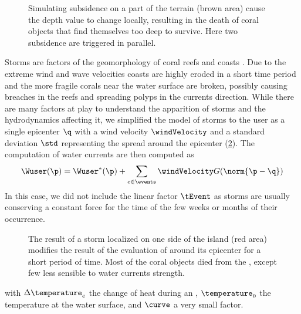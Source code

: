 \begin{figure}
    \caption{Simulating subsidence on a part of the terrain (brown area) cause the depth value to change locally, resulting in the death of coral objects that find themselves too deep to survive. Here two subsidence  are triggered in parallel. }
    \label{fig:env-obj_subsidence-event}
\end{figure}

Storms are factors of the geomorphology of coral reefs \cite{VilaConcejo2016, Oron2023} and coasts \cite{Dominguez2005, Cowart2010}. Due to the extreme wind and wave velocities coasts are highly eroded in a short time period and the more fragile corals near the water surface are broken, possibly causing breaches in the reefs and spreading polyps in the currents direction. While there are many factors at play to understand the apparition of storms and the hydrodynamics affecting it, we simplified the model of storms to the user as a single epicenter $\q$ with a wind velocity $\windVelocity$ and a standard deviation $\std$ representing the spread around the epicenter (\cref{fig:env-obj_storm-event}). The computation of water currents are then computed as 
\begin{align*}
    \Wuser(\p) = \Wuser^*(\p) + \sum_{e \in \events} {\windVelocity G(\norm{\p - \q})}
\end{align*}
In this case, we did not include the linear factor $\tEvent$ as storms are usually conserving a constant force for the time of the few weeks or months of their occurrence. 

\begin{figure}
    \caption{The result of a storm localized on one side of the island (red area) modifies the result of the evaluation of  around its epicenter for a short period of time. Most of the coral objects died from the , except few  less sensible to water currents strength. }
    \label{fig:env-obj_storm-event}
\end{figure}

with $\Delta \temperature_e$ the change of heat during an , $\temperature_0$ the temperature at the water surface, and $\curve$ a very small factor.

